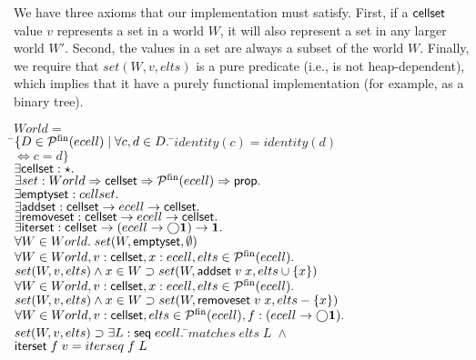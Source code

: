 We have three axioms that our implementation must satisfy. First, if a
$\mathsf{cellset}$ value $v$ represents a set in a world $W$, it will also
represent a set in any larger world $W'$. Second, the values in a set
are always a subset of the world $W$. Finally, we require that
$set(W,v,elts)$ is a pure predicate (i.e., is not heap-dependent),
which implies that it have a purely functional implementation (for
example, as a binary tree). 


\begin{tabbing}
$World = $ \\
\;\;\;\;\=$\{D \in \mathcal{P}^{\mathrm{fin}}(ecell)\;|\;\forall c,d \in D.\;$\=$identity(c) = identity(d)$\\
        \>                                                      \>$\iff c = d\}$\\[1em]

$\exists \mathsf{cellset} : \star.$ \\
$\exists set : World \Rightarrow \mathsf{cellset} \Rightarrow \mathcal{P}^{\mathrm{fin}}(ecell) \Rightarrow \mathsf{prop}.$ \\
$\exists \mathsf{emptyset}    : cellset.$ \\
$\exists \mathsf{addset}      : \mathsf{cellset} \to ecell \to \mathsf{cellset}.$ \\
$\exists \mathsf{removeset}   : \mathsf{cellset} \to ecell \to \mathsf{cellset}.$ \\
$\exists \mathsf{iterset}     : \mathsf{cellset} \to (ecell \to \bigcirc{\mathbf{1}}) \to \mathbf{1}.$\\[1em]

$\forall W \in World.\; set(W, \mathsf{emptyset}, \emptyset)$ \\[1em]


$\forall W \in World, v : \mathsf{cellset}, x : ecell, elts \in \mathcal{P}^{\mathrm{fin}}(ecell).$ \\ 
\> $set(W, v, elts) \land x \in W \supset set(W, \mathsf{addset}\;v\;x, elts \cup \{{x}\})$ \\[1em]


$\forall W \in World, v : \mathsf{cellset}, x : ecell, elts \in \mathcal{P}^{\mathrm{fin}}(ecell).$ \\ 
\> $set(W, v, elts) \land x \in W \supset set(W, \mathsf{removeset}\;v\;x, elts - \{{x}\})$ \\[1em]


$\forall W \in World, v : \mathsf{cellset}, elts \in \mathcal{P}^{\mathrm{fin}}(ecell), 
         f : (ecell \to \bigcirc{\mathbf{1}}).$ \\ 
\> $set(W, v, elts) \supset \exists L : \mathsf{seq}\;{ecell}.\;$\=$matches\;elts\;L\; \land$ \\
\>                                \>$\mathsf{iterset}\;f\;v = iterseq\;f\;L$ \\[1em]



\end{tabbing}
